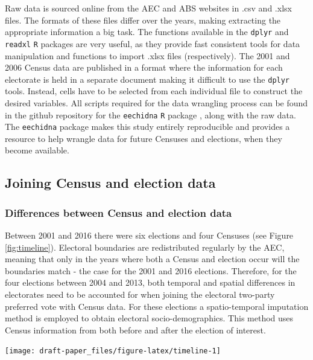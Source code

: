 \documentclass[11pt,a4paper,]{article}
\let\origfigure\figure
\let\endorigfigure\endfigure
\renewenvironment{figure}[1][2] {
    \expandafter\origfigure\expandafter[H]
} {
    \endorigfigure
}
\begin{document}
Raw data is sourced online from the AEC and ABS websites in .csv and .xlsx files. The formats of these files differ over the years, making extracting the appropriate information a big task. The functions available in the \texttt{dplyr} \autocite{dplyr} and \texttt{readxl} \autocite{readxl} \texttt{R} packages are very useful, as they provide fast consistent tools for data manipulation and functions to import .xlsx files (respectively). The 2001 and 2006 Census data are published in a format where the information for each electorate is held in a separate document making it difficult to use the \texttt{dplyr} tools. Instead, cells have to be selected from each individual file to construct the desired variables. All scripts required for the data wrangling process can be found in the github repository for the \texttt{eechidna} \texttt{R} package \autocite{eechidna}, along with the raw data. The \texttt{eechidna} package makes this study entirely reproducible and provides a resource to help wrangle data for future Censuses and elections, when they become available.

\hypertarget{joining-census-and-election-data}{%
\subsection{Joining Census and election data}\label{joining-census-and-election-data}}

\hypertarget{differences-between-census-and-election-data}{%
\subsubsection{Differences between Census and election data}\label{differences-between-census-and-election-data}}

Between 2001 and 2016 there were six elections and four Censuses (see Figure \ref{fig:timeline}). Electoral boundaries are redistributed regularly by the AEC, meaning that only in the years where both a Census and election occur will the boundaries match - the case for the 2001 and 2016 elections. Therefore, for the four elections between 2004 and 2013, both temporal and spatial differences in electorates need to be accounted for when joining the electoral two-party preferred vote with Census data. For these elections a spatio-temporal imputation method is employed to obtain electoral socio-demographics. This method uses Census information from both before and after the election of interest.

\begin{figure}[h]

{\centering \texttt{[image: draft-paper\_files/figure-latex/timeline-1]} 

}

\caption{Timeline of Australian elections and Censuses. They do not always occur in the same year.}\label{fig:timeline}
\end{figure}
\end{document}
